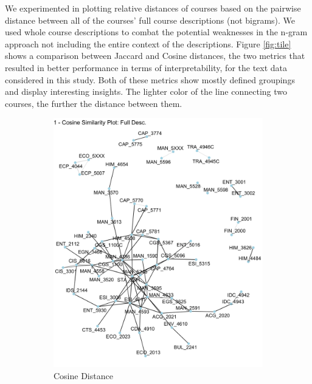 We experimented in plotting relative distances of courses based on the pairwise distance between all of the courses' full course descriptions (not bigrams).  
We used whole course descriptions to combat the potential weaknesses in the n-gram approach not including the entire context of the descriptions.   
Figure \ref{fig:tile} shows a comparison between Jaccard and Cosine distances, the two metrics that resulted in better performance in terms of interpretability,  
for the text data considered in this study. Both of these metrics show mostly defined groupings and display interesting insights. The lighter color of the 
line connecting two courses, the further the distance between them.


\begin{figure}[H]
\centering
\begin{subfigure}{.5\textwidth}
  \centering
  \includegraphics[width=1\linewidth]{Content/images/cos.png}
  \caption{Cosine Distance}
  \label{fig:cos}
\end{subfigure}%
\begin{subfigure}{.5\textwidth}
  \centering

\end{subfigure}
\end{figure}
